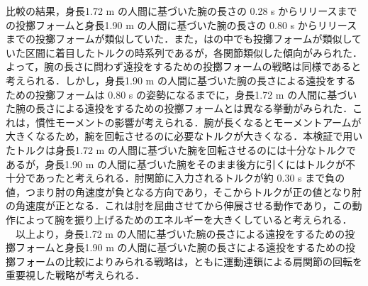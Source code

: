 \begin{small}
比較の結果，身長1.72 m の人間に基づいた腕の長さの 0.28 s からリリースまでの投擲フォームと身長1.90 m の人間に基づいた腕の長さの 0.80 s からリリースまでの投擲フォームが類似していた．また，はの中でも投擲フォームが類似していた区間に着目したトルクの時系列であるが，各関節類似した傾向がみられた．よって，腕の長さに問わず遠投をするための投擲フォームの戦略は同様であると考えられる．しかし，身長1.90 m の人間に基づいた腕の長さによる遠投をするための投擲フォームは 0.80 s の姿勢になるまでに，身長1.72 m の人間に基づいた腕の長さによる遠投をするための投擲フォームとは異なる挙動がみられた．これは，慣性モーメントの影響が考えられる．腕が長くなるとモーメントアームが大きくなるため，腕を回転させるのに必要なトルクが大きくなる．本検証で用いたトルクは身長1.72 m の人間に基づいた腕を回転させるのには十分なトルクであるが，身長1.90 m の人間に基づいた腕をそのまま後方に引くにはトルクが不十分であったと考えられる．肘関節に入力されるトルクが約 0.30 s まで負の値，つまり肘の角速度が負となる方向であり，そこからトルクが正の値となり肘の角速度が正となる．これは肘を屈曲させてから伸展させる動作であり，この動作によって腕を振り上げるためのエネルギーを大きくしていると考えられる．\\
　以上より，身長1.72 m の人間に基づいた腕の長さによる遠投をするための投擲フォームと身長1.90 m の人間に基づいた腕の長さによる遠投をするための投擲フォームの比較によりみられる戦略は，ともに運動連鎖による肩関節の回転を重要視した戦略が考えられる．

\end{small}

